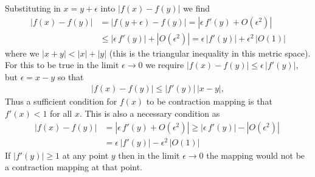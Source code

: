\documentclass{sotonExamBoxes}    %
\begin{document}
\begin{question}{10}
  \begin{qparts}
    \begin{answer}
      Substituting in $x= y+\epsilon$ into  $|f(x) - f(y)|$
      we find
      \begin{align*}
        |f(x) - f(y)|
        &= |f(y + \epsilon) -f(y)| = |\epsilon\, f'(y) + O(\epsilon^2)|
        \\
        &\leq |\epsilon\, f'(y)| + | O(\epsilon^2)|
          = \epsilon \, |f'(y)| +\epsilon^2 \, | O(1)|
      \end{align*}
      where we $|x+y| <|x| +|y|$ (this is the triangular inequality in
      this metric space).  For this to be true in the limit
      $\epsilon\rightarrow 0$ we require $ |f(x) - f(y)| \leq
      \epsilon \, |f'(y)|$, but $\epsilon = x-y$ so that
      \begin{align*}
         |f(x) - f(y)| \leq |f'(y)|\, |x-y|,
      \end{align*}
      Thus a sufficient condition for $f(x)$ to be contraction
      mapping is that $f'(x)<1$ for all $x$.  This is also a
      necessary condition as
      \begin{align*}
         |f(x) - f(y)|
        &=  |\epsilon\, f'(y) + O(\epsilon^2)| \geq
          |\epsilon\, f'(y)| - |O(\epsilon^2)| \
        \\
        &=  \epsilon\, |f'(y)| - \epsilon^2 \,|O(1)|           
      \end{align*}
      If $|f'(y)|\geq 1$ at any point $y$ then in the limit $\epsilon
      \rightarrow 0$ the mapping would not be a contraction mapping at
      that point.
    \end{answer}
  \end{qparts}
\end{question}
\end{document}
